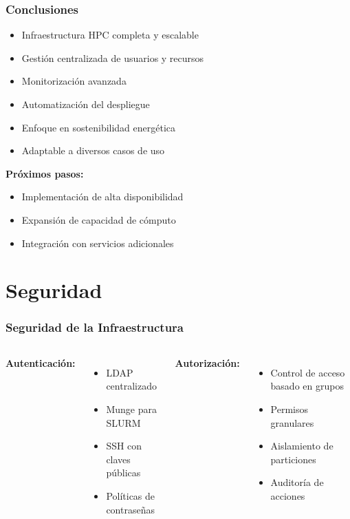 \documentclass[aspectratio=169]{beamer}
\begin{document}
\begin{frame}
\frametitle{Conclusiones}
\begin{itemize}
    \item Infraestructura HPC completa y escalable
    \item Gestión centralizada de usuarios y recursos
    \item Monitorización avanzada
    \item Automatización del despliegue
    \item Enfoque en sostenibilidad energética
    \item Adaptable a diversos casos de uso
\end{itemize}

\textbf{Próximos pasos:}
\begin{itemize}
    \item Implementación de alta disponibilidad
    \item Expansión de capacidad de cómputo
    \item Integración con servicios adicionales
\end{itemize}
\end{frame}
\section{Seguridad}

\begin{frame}
\frametitle{Seguridad de la Infraestructura}
\begin{columns}
\textbf{Autenticación:}
\begin{itemize}
    \item LDAP centralizado
    \item Munge para SLURM
    \item SSH con claves públicas
    \item Políticas de contraseñas
\end{itemize}

\textbf{Autorización:}
\begin{itemize}
    \item Control de acceso basado en grupos
    \item Permisos granulares
    \item Aislamiento de particiones
    \item Auditoría de acciones
\end{itemize}
\end{columns}
\end{frame}
\end{document}

